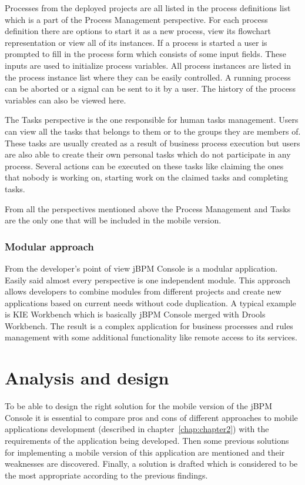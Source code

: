 \documentclass[12pt,oneside,final]{fithesis2}
\begin{document}
Processes from the deployed projects are all listed in the process definitions list which is a part of the Process Management perspective.
For each process definition there are options to start it as a new process, view its flowchart representation or view all of its instances.
If a process is started a user is prompted to fill in the process form which consists of some input fields.
These inputs are used to initialize process variables.
All process instances are listed in the process instance list where they can be easily controlled.
A running process can be aborted or a signal can be sent to it by a user.
The history of the process variables can also be viewed here.

The Tasks perspective is the one responsible for human tasks management.
Users can view all the tasks that belongs to them or to the groups they are members of.
These tasks are usually created as a result of business process execution but users are also able to create their own personal tasks which do not participate in any process.
Several actions can be executed on these tasks like claiming the ones that nobody is working on, starting work on the claimed tasks and completing tasks.

From all the perspectives mentioned above the Process Management and Tasks are the only one that will be included in the mobile version.

\subsection{Modular approach}

From the developer's point of view jBPM Console is a modular application.
Easily said almost every perspective is one independent module.
This approach allows developers to combine modules from different projects and create new applications based on current needs without code duplication.
A typical example is KIE Workbench which is basically jBPM Console merged with Drools Workbench.
The result is a complex application for business processes and rules management with some additional functionality like remote access to its services.



\chapter{Analysis and design}
To be able to design the right solution for the mobile version of the jBPM Console it is essential to compare pros and cons of different approaches to mobile applications development (described in chapter~\ref{chap:chapter2}) with the requirements of the application being developed.
Then some previous solutions for implementing a mobile version of this application are mentioned and their weaknesses are discovered.
Finally, a solution is drafted which is considered to be the most appropriate according to the previous findings.
\end{document}
